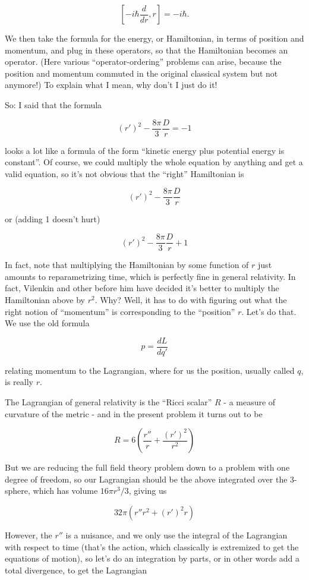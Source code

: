\documentclass{article}
\begin{document}
\[[-i \hbar \frac{d}{dr}, r] = -i \hbar.\]

We then take the formula for the energy, or Hamiltonian, in terms of
position and momentum, and plug in these operators, so that the
Hamiltonian becomes an operator. (Here various ``operator-ordering''
problems can arise, because the position and momentum commuted in the
original classical system but not anymore!) To explain what I mean, why
don't I just do it!

So: I said that the formula

\[(r')^2 - \frac{8\pi}{3} \frac{D}{r} = - 1 \tag{3}\]

looks a lot like a formula of the form ``kinetic energy plus potential
energy is constant''. Of course, we could multiply the whole equation by
anything and get a valid equation, so it's not obvious that the
``right'' Hamiltonian is

\[(r')^2 - \frac{8\pi}{3} \frac{D}{r}\]

or (adding 1 doesn't hurt)

\[(r')^2 - \frac{8\pi}{3} \frac{D}{r} + 1\]

In fact, note that multiplying the Hamiltonian by some function of \(r\)
just amounts to reparametrizing time, which is perfectly fine in general
relativity. In fact, Vilenkin and other before him have decided it's
better to multiply the Hamiltonian above by \(r^2\). Why? Well, it has
to do with figuring out what the right notion of ``momentum'' is
corresponding to the ``position'' \(r\). Let's do that. We use the old
formula

\[p = \frac{dL}{dq'}\]

relating momentum to the Lagrangian, where for us the position, usually
called \(q\), is really \(r\).

The Lagrangian of general relativity is the ``Ricci scalar'' \(R\) - a
measure of curvature of the metric - and in the present problem it turns
out to be

\[R = 6 \left(\frac{r''}{r} + \frac{(r')^2}{r^2}\right)\]

But we are reducing the full field theory problem down to a problem with
one degree of freedom, so our Lagrangian should be the above integrated
over the 3-sphere, which has volume \(16 \pi r^3/3\), giving us

\[32\pi (r''r^2 + (r')^2 r)\]

However, the \(r''\) is a nuisance, and we only use the integral of the
Lagrangian with respect to time (that's the action, which classically is
extremized to get the equations of motion), so let's do an integration
by parts, or in other words add a total divergence, to get the
Lagrangian
\end{document}
